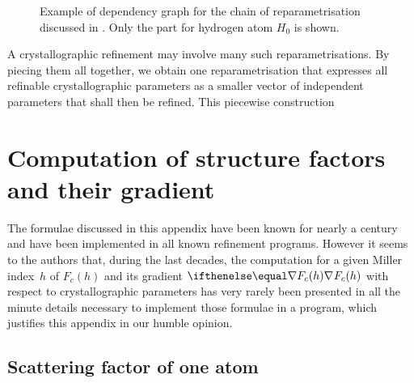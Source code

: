 \documentclass[pdf]{iucr}
\begin{document}
\begin{figure}
\label{fig:dependencegraphexample}
\caption{Example of dependency graph for the chain of reparametrisation discussed in . Only the part for hydrogen atom $H_0$ is shown.}
\end{figure}

A crystallographic refinement may involve many such reparametrisations. By piecing them all together, we obtain one reparametrisation that expresses all refinable crystallographic parameters as a smaller vector of independent parameters that shall then be refined. This piecewise construction

\appendix
\section{Computation of structure factors and their gradient}

The formulae discussed in this appendix have been known for nearly a century and have been implemented in all known refinement programs. However it seems to the authors that, during the last decades, the computation for a given Miller index~$h$ of $F_c(h)$ and its gradient $\grad{F_c(h)}$ with respect to crystallographic parameters has very rarely been presented in all the minute details necessary to implement those formulae in a program, which justifies this appendix in our humble opinion.

\subsection{Scattering factor of one atom}

\newcommand{\Fuc}{F_{\text{uc}}}
\end{document}
